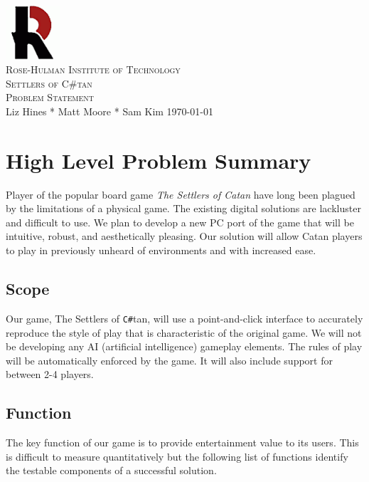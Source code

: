 \documentclass[12pt]{article}
\begin{document}
\begin{titlepage}
\begin{center}
\includegraphics[width=0.15\textwidth]{Images/logo}\\[1cm]
\textsc{\LARGE Rose-Hulman Institute of Technology}\\[1.5cm]
\textsc{\Large Settlers of C\#tan}\\[1.0cm]
\textsc{\Large Problem Statement}\\[1.0cm]
\Large Liz Hines \hspace{0.2cm}*\hspace{0.2cm}  Matt Moore \hspace{0.2cm}*\hspace{0.2cm} Sam	Kim
\vfill
\large \today
\end{center}
\end{titlepage}

\newpage
{\small \tableofcontents}
\newpage

\section{High Level Problem Summary}
Player of the popular board game \emph{The Settlers of Catan} have long been plagued by the limitations of a physical game. The existing digital solutions are lackluster and difficult to use. We plan to develop a new PC port of the game that will be intuitive, robust, and aesthetically pleasing. Our solution will allow Catan players to play in previously unheard of environments and with increased ease.

\subsection{Scope}
Our game, The Settlers of \verb!C#!tan, will use a point-and-click interface to accurately reproduce the style of play that is characteristic of the original game. We will not be developing any AI (artificial intelligence) gameplay elements. The rules of play will be automatically enforced by the game. It will also include support for between 2-4 players. 

\subsection{Function}
The key function of our game is to provide entertainment value to its users. This is difficult to measure quantitatively but the following list of functions identify the testable components of a successful solution.
\end{document}
